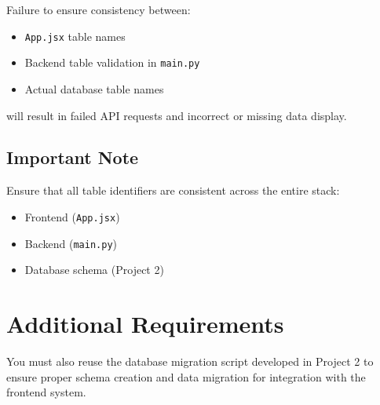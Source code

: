 \documentclass{article}
\begin{document}
Failure to ensure consistency between:
\begin{itemize}
    \item \texttt{App.jsx} table names
    \item Backend table validation in \texttt{main.py}
    \item Actual database table names
\end{itemize}

will result in failed API requests and incorrect or missing data display.

\subsection*{Important Note}

Ensure that all table identifiers are consistent across the entire stack:
\begin{itemize}
    \item Frontend (\texttt{App.jsx})
    \item Backend (\texttt{main.py})
    \item Database schema (Project 2)
\end{itemize}



\section*{Additional Requirements}

You must also reuse the database migration script developed in Project 2 to ensure proper schema creation and data migration for integration with the frontend system.
\end{document}
